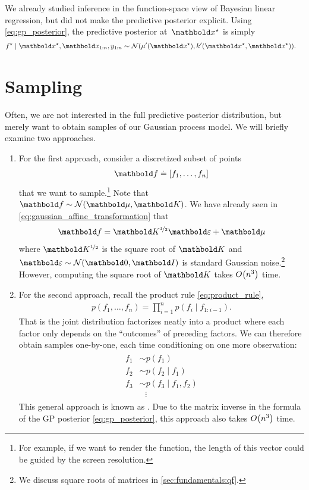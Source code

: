 We already studied inference in the function-space view of Bayesian linear regression, but did not make the predictive posterior explicit.
Using \cref{eq:gp_posterior}, the predictive posterior at~$\vxs$ is simply \begin{align}
  \fs \mid \vxs, \vx_{1:n}, y_{1:n} &\sim \N{\mu'(\vxs)}{k'(\vxs,\vxs)}.
\end{align}

\section{Sampling}\label{sec:gp:sampling}

Often, we are not interested in the full predictive posterior distribution, but merely want to obtain samples of our Gaussian process model.
We will briefly examine two approaches.

\begin{enumerate}
  \item For the first approach, consider a discretized subset of points \begin{align*}
    \vf \defeq [f_1, \dots, f_n]
  \end{align*} that we want to sample.\footnote{For example, if we want to render the function, the length of this vector could be guided by the screen resolution.}
  Note that $\vf \sim \N{\vmu}{\mK}$.
  We have already seen in \cref{eq:gaussian_affine_transformation} that \begin{align}
    \vf = \msqrt{\mK} \vvarepsilon + \vmu
  \end{align} where $\msqrt{\mK}$ is the square root of $\mK$ and $\vvarepsilon \sim \SN$ is standard Gaussian noise.\footnote{We discuss square roots of matrices in \cref{sec:fundamentals:qf}.}
  However, computing the square root of $\mK$ takes $\BigO{n^3}$ time.

  \item For the second approach, recall the product rule \eqref{eq:product_rule}, \begin{align*}
    p(f_1, \dots, f_n) = \prod_{i=1}^n p(f_i \mid f_{1:i-1}).
  \end{align*}
  That is the joint distribution factorizes neatly into a product where each factor only depends on the ``outcomes'' of preceding factors.
  We can therefore obtain samples one-by-one, each time conditioning on one more observation: \begin{align}\begin{split}
    f_1 &\sim p(f_1) \\
    f_2 &\sim p(f_2 \mid f_1) \\
    f_3 &\sim p(f_3 \mid f_1, f_2) \\
    &\;\:\,\vdots
  \end{split}\end{align}
  This general approach is known as .
  Due to the matrix inverse in the formula of the GP posterior \eqref{eq:gp_posterior}, this approach also takes $\BigO{n^3}$ time.
\end{enumerate}

